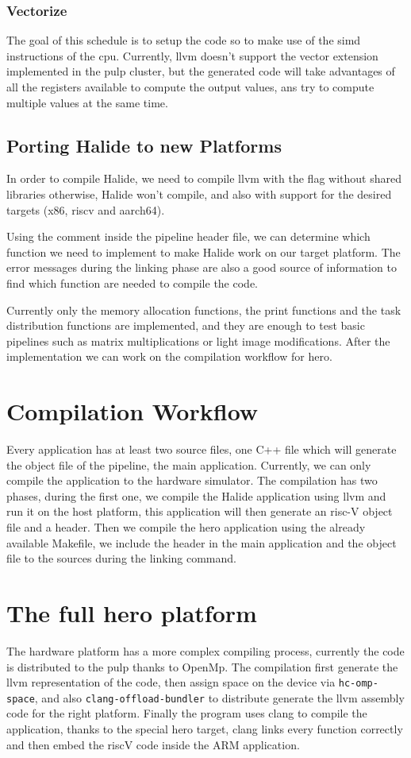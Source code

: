 	\subsubsection{Vectorize}
	The goal of this schedule is to setup the code so to make use of the \gls{simd} instructions of the \gls{cpu}. Currently, \gls{llvm} doesn't support the vector extension  implemented in the pulp cluster, but the generated code will take advantages of all the registers available to compute the output values, ans try to compute multiple values at the same time.


	\subsection { Porting Halide to new Platforms}
	In order to compile Halide, we need to compile \gls{llvm} with the flag without shared libraries otherwise, Halide won't compile, and also with support for the desired targets (x86, \gls{riscv} and \gls{aarch64}).

		Using the  comment inside the pipeline header file, we can determine which function we need to implement to make Halide work on our target platform. The error messages during the linking phase are also a good source of information to find which function are needed to compile the code. 

		Currently only the memory allocation functions, the print functions and the task distribution functions are implemented, and they are enough to  test basic pipelines such as matrix multiplications or light image modifications.
	After the implementation we can work on the compilation workflow for hero.


\section{Compilation Workflow}
	Every application has at least two source files, one C++ file which will generate the object file of the pipeline, the main application. 
	Currently, we can only compile the application to the hardware simulator.
	The compilation has two phases, during the first one, we compile the Halide application using llvm and run it on the host platform, this application will then generate an risc-V object file and a header.
	Then we compile the hero application using the already available Makefile, we include the header in the main application and the object file to the sources during the linking command.

		
\section{The full hero platform}
	The hardware platform has a more complex compiling process, currently the code is distributed to the \gls{pulp} thanks to OpenMp. The compilation first generate the llvm representation of the  code, then assign space on the device via \verb|hc-omp-space|, and also \verb|clang-offload-bundler| to distribute generate the llvm assembly code for the right platform. Finally the  program uses clang to compile the application, thanks to the special hero target, clang links every function correctly and then embed the riscV code inside the ARM application.

